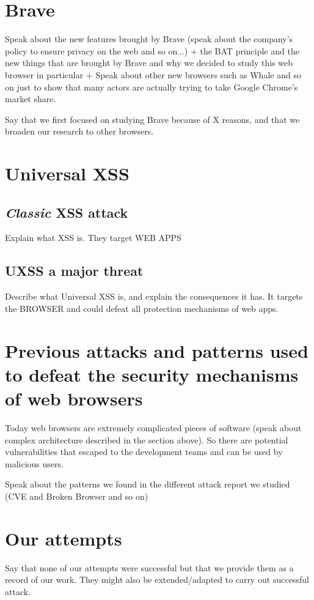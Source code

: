 \documentclass[journal]{IEEEtran}
\begin{document}
\section{Brave}
Speak about the new features brought by Brave (speak about the company's policy to ensure privacy on the web and so on...) + the BAT principle and the new things that are brought by Brave and why we decided to study this web browser in particular
+ Speak about other new browsers such as Whale and so on just to show that many actors are actually trying to take Google Chrome's market share.

Say that we first focused on studying Brave because of X reasons, and that we broaden our research to other browsers.

\section{Universal XSS}
\subsection{\emph{Classic} XSS attack}
Explain what XSS is. They target WEB APPS

\subsection{UXSS a major threat}
Describe what Universal XSS is, and explain the consequences it has. It targets the BROWSER and could defeat all protection mechanisms of web apps.

\section{Previous attacks and patterns used to defeat the security mechanisms of web browsers}
Today web browsers are extremely complicated pieces of software (speak about complex architecture described in the section above). So there are potential vulnerabilities that escaped to the development teams and can be used by malicious users.

\medskip

Speak about the patterns we found in the different attack report we studied (CVE and Broken Browser and so on)

\section{Our attempts}
Say that none of our attempts were successful but that we provide them as a record of our work. They might also be extended/adapted to carry out successful attack.
\end{document}
